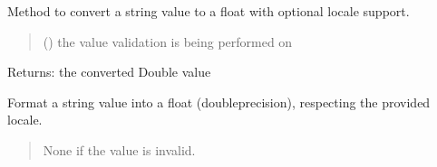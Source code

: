 \documentclass[letterpaper,10pt,english]{sphinxmanual}
\begin{document}
\begin{fulllineitems}
\begin{fulllineitems}
\label{\detokenize{apache_commons_validator_python:apache_commons_validator_python.generic_type_validator_new.GenericTypeValidator.format_double}}
\pysigstartsignatures
{}
\pysigstopsignatures
\sphinxAtStartPar
Method to convert a string value to a float with optional locale support.
\begin{quote}\begin{description}
\sphinxAtStartPar
{} () \textendash{} the value validation is being performed on

\end{description}\end{quote}

\sphinxAtStartPar
Returns: the converted Double value

\end{fulllineitems}


\begin{fulllineitems}
\label{\detokenize{apache_commons_validator_python:apache_commons_validator_python.generic_type_validator_new.GenericTypeValidator.format_double_locale}}
\pysigstartsignatures
{}
\pysigstopsignatures
\sphinxAtStartPar
Format a string value into a float (double\sphinxhyphen{}precision), respecting the
provided locale.
\begin{quote}\begin{description}
\sphinxAtStartPar
None if the value is invalid.


\end{description}
\end{quote}
\end{fulllineitems}
\end{fulllineitems}
\end{document}

